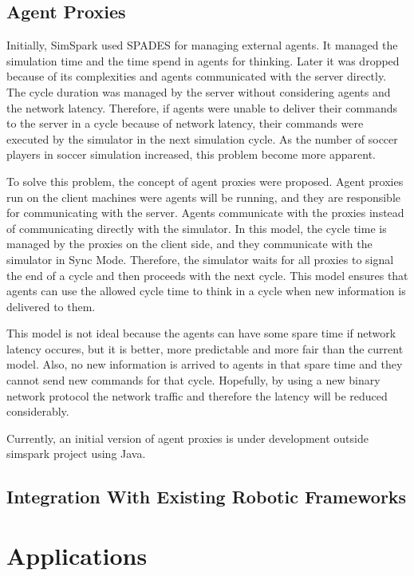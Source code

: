 \documentclass{llncs}
\begin{document}
\subsection{Agent Proxies}
Initially, SimSpark used SPADES\cite{riley2003spades} for managing external agents. It
managed the simulation time and the time spend in agents for thinking. Later it was
dropped because of its complexities and agents communicated with the server directly.
The cycle duration was managed by the server without considering agents and the network
latency. Therefore, if agents were unable to deliver their commands to the server in a
cycle because of network latency, their commands were executed by the simulator
in the next simulation cycle. As the number of soccer players in soccer simulation 
increased, this problem become more apparent.

To solve this problem, the concept of agent proxies were proposed. Agent proxies
run on the client machines were agents will be running, and they are responsible for
communicating with the server. Agents communicate with the proxies instead of 
communicating directly with the simulator. In this model, the cycle time is managed
by the proxies on the client side, and they communicate with the simulator in Sync Mode.
Therefore, the simulator waits for all proxies to signal the end of a cycle and 
then proceeds with the next cycle. This model ensures that agents can use the allowed
cycle time to think in a cycle when new information is delivered to them. 

This model is not ideal because the agents can have some spare time if network latency
occures, but it is better, more predictable and more fair than the current model. Also,
no new information is arrived to agents in that spare time and they cannot send new 
commands for that cycle. Hopefully, by using a new binary network protocol the network 
traffic and therefore the latency will be reduced considerably.

Currently, an initial version of agent proxies is under development outside simspark
project using Java.

\subsection{Integration With Existing Robotic Frameworks}


\section{Applications}
\label{s:application}
\end{document}
